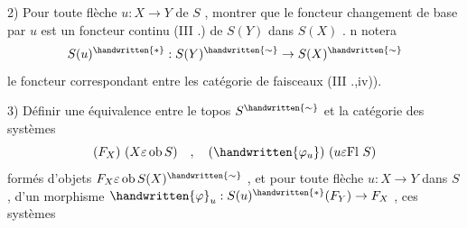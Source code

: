 2) Pour toute flèche \(u:X\to Y\) de \(S\) , montrer que le foncteur changement de base par \(u\) est un foncteur continu (III .) de \(S(Y)\) dans \(S(X)\) . n notera
\[
S(u)^{\handwritten{*}}:S(Y)^{\handwritten{\sim}}\to S(X)^{\handwritten{\sim}}
\]
le foncteur correspondant entre les catégorie de faisceaux (III .,iv)).

3) Définir une équivalence entre le topos \(S^{\handwritten{\sim}}\) et la catégorie des systèmes
\[
(F_X)\ (X\varepsilon\operatorname{ob}S)\quad,\quad(\handwritten{\varphi_u})\ (u\varepsilon\mathrm{Fl}\ S)
\]
formés d'objets \(F_X\varepsilon\operatorname{ob}S(X)^{\handwritten{\sim}}\) , et pour toute flèche \(u:X\to Y\) dans \(S\) , d'un morphisme \(\handwritten{\varphi}_u:S(u)^{\handwritten{*}}(F_Y)\to F_X\) , ces systèmes
